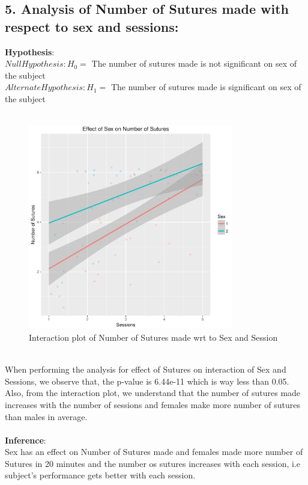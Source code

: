 \documentclass[12pt,epsf]{report}
\begin{document}
\subsection*{5. Analysis of Number of Sutures made with respect to sex and sessions:}
\textbf{Hypothesis}:\\
$Null Hypothesis : H_0 = $ The number of sutures made is not significant on sex of the subject\\
$Alternate Hypothesis : H_1 = $ The number of sutures made is  significant on sex of the subject\\
\\
\begin{figure}[!htb]
	\centering
	\includegraphics[width=0.8\textwidth]{SuturingVsSex.pdf}
	\caption{Interaction plot of Number of Sutures made wrt to Sex and Session}
	\centering
\end{figure}
\\
When performing the analysis for effect of Sutures on interaction of Sex and Sessions, we observe that, the p-value is 6.44e-11 which is way less than 0.05.\\
Also, from the interaction plot, we understand that the number of sutures made increases with the number of sessions and females make more number of sutures than males in average.\\
\\
\textbf{Inference}:\\
Sex has an effect on Number of Sutures made and females made more number of Sutures in 20 minutes and the number os sutures increases with each session, i.e subject's performance gets better with each session.\\
\end{document}

